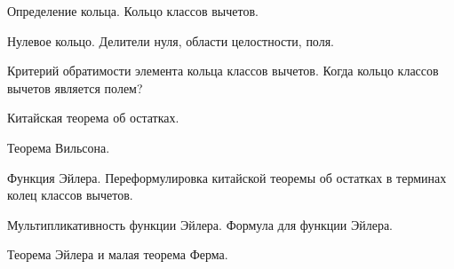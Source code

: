 \documentclass[12pt]{article}
\begin{document}
\begin{compactenum}
\item Определение кольца. Кольцо классов вычетов.
\item Нулевое кольцо. Делители нуля, области целостности, поля.
\item Критерий обратимости элемента кольца классов вычетов. Когда
  кольцо классов вычетов является полем?
\item Китайская теорема об остатках.
\item Теорема Вильсона.
\item Функция Эйлера. Переформулировка китайской теоремы об остатках в
терминах колец классов вычетов.
\item Мультипликативность функции Эйлера. Формула для функции Эйлера.
\item Теорема Эйлера и малая теорема Ферма.
\end{compactenum}
\end{document}

